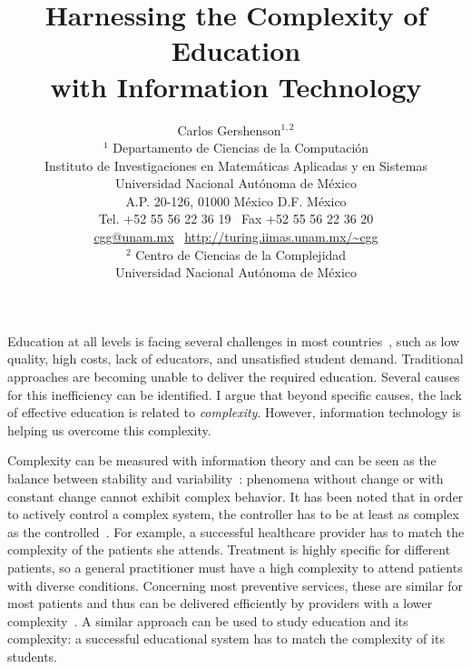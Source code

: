 \documentclass[12pt]{article}
\begin{document}
\title{Harnessing the Complexity of Education\\ with Information Technology} 

\author
{Carlos Gershenson$^{1,2}$\\
$^{1}$ Departamento de Ciencias de la Computaci\'on\\
Instituto de Investigaciones en Matem\'aticas Aplicadas y en Sistemas \\
Universidad Nacional Aut\'onoma de M\'exico\\
A.P. 20-126, 01000 M\'exico D.F. M\'exico\\
Tel. +52 55 56 22 36 19 \
Fax +52 55 56 22 36 20 \\
\href{mailto:cgg@unam.mx}{cgg@unam.mx} \
\url{http://turing.iimas.unam.mx/~cgg} \\
$^{2}$ Centro de Ciencias de la Complejidad \\
Universidad Nacional Aut\'onoma de M\'exico
}







\maketitle 



Education at all levels is facing several challenges in most countries~\cite{Linn1987SciEdu,Robinson1998All-Our-Futures,Hines2013EduChallenges,Kremer2013EduDevWorld}, such as low quality, high costs, lack of educators, and unsatisfied student demand. Traditional approaches are becoming unable to deliver the required education. Several causes for this inefficiency can be identified. I argue that beyond specific causes, the lack of effective education is related to \emph{complexity}. However, information technology is helping us overcome this complexity.


Complexity can be measured with information theory and can be seen as the balance between stability and variability~\cite{Langton1990,Prokopenko:2008,GershensonFernandez:2012}: phenomena without change or with constant change cannot exhibit complex behavior. It has been noted that in order to actively control a complex system, the controller has to be at least as complex as the controlled~\cite{Ashby1956,BarYam2004}. For example, a successful healthcare provider has to match the complexity of the patients she attends. Treatment is highly specific for different patients, so a general practitioner must have a high complexity to attend patients with diverse conditions. Concerning most preventive services, these are similar for most patients and thus can be delivered efficiently by providers with a lower complexity~\cite{BarYamAJPH2006}. A similar approach can be used to study education and its complexity: a successful educational system has to match the complexity of its students.
\end{document}
